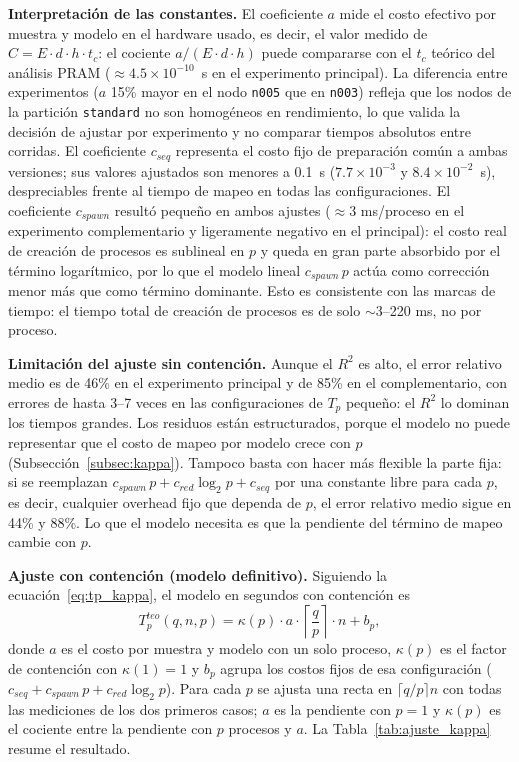 \documentclass[11pt, a4paper]{article}
\begin{document}
\textbf{Interpretación de las constantes.} El coeficiente $a$ mide el costo efectivo por muestra y modelo en el hardware usado, es decir, el valor medido de $C = E \cdot d \cdot h \cdot t_c$: el cociente $a/(E \cdot d \cdot h)$ puede compararse con el $t_c$ teórico del análisis PRAM ($\approx 4.5 \times 10^{-10}$~s en el experimento principal). La diferencia entre experimentos ($a$ 15\% mayor en el nodo \texttt{n005} que en \texttt{n003}) refleja que los nodos de la partición \texttt{standard} no son homogéneos en rendimiento, lo que valida la decisión de ajustar por experimento y no comparar tiempos absolutos entre corridas. El coeficiente $c_{seq}$ representa el costo fijo de preparación común a ambas versiones; sus valores ajustados son menores a 0.1~s ($7.7\times10^{-3}$ y $8.4\times10^{-2}$~s), despreciables frente al tiempo de mapeo en todas las configuraciones. El coeficiente $c_{spawn}$ resultó pequeño en ambos ajustes ($\approx 3$ ms/proceso en el experimento complementario y ligeramente negativo en el principal): el costo real de creación de procesos es sublineal en $p$ y queda en gran parte absorbido por el término logarítmico, por lo que el modelo lineal $c_{spawn}\,p$ actúa como corrección menor más que como término dominante. Esto es consistente con las marcas de tiempo: el tiempo total de creación de procesos es de solo $\sim$3--220 ms, no por proceso.

\textbf{Limitación del ajuste sin contención.} Aunque el $R^2$ es alto, el error relativo medio es de 46\% en el experimento principal y de 85\% en el complementario, con errores de hasta 3--7 veces en las configuraciones de $T_p$ pequeño: el $R^2$ lo dominan los tiempos grandes. Los residuos están estructurados, porque el modelo no puede representar que el costo de mapeo por modelo crece con $p$ (Subsección~\ref{subsec:kappa}). Tampoco basta con hacer más flexible la parte fija: si se reemplazan $c_{spawn}\,p+c_{red}\log_2 p+c_{seq}$ por una constante libre para cada $p$, es decir, cualquier overhead fijo que dependa de $p$, el error relativo medio sigue en 44\% y 88\%. Lo que el modelo necesita es que la pendiente del término de mapeo cambie con $p$.

\textbf{Ajuste con contención (modelo definitivo).} Siguiendo la ecuación~\eqref{eq:tp_kappa}, el modelo en segundos con contención es
\begin{equation}
T_p^{teo}(q, n, p) = \kappa(p)\cdot a \cdot \left\lceil \frac{q}{p} \right\rceil \cdot n + b_p,
\label{eq:tpeo_cont}
\end{equation}
donde $a$ es el costo por muestra y modelo con un solo proceso, $\kappa(p)$ es el factor de contención con $\kappa(1)=1$ y $b_p$ agrupa los costos fijos de esa configuración ($c_{seq}+c_{spawn}\,p+c_{red}\log_2 p$). Para cada $p$ se ajusta una recta en $\lceil q/p\rceil n$ con todas las mediciones de los dos primeros casos; $a$ es la pendiente con $p=1$ y $\kappa(p)$ es el cociente entre la pendiente con $p$ procesos y $a$. La Tabla~\ref{tab:ajuste_kappa} resume el resultado.
\end{document}

